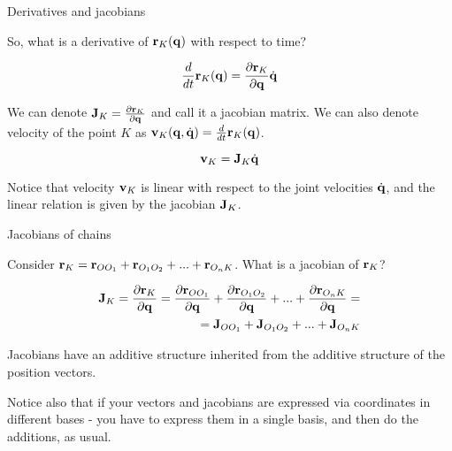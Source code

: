 \documentclass{beamer}
\begin{document}
\begin{frame}{Derivatives and jacobians}
	\begin{flushleft}
		
		So, what is a derivative of $\mathbf{r}_K(\mathbf{q})$ with respect to time?  
		
		\begin{equation}
			\frac{d}{dt} \mathbf{r}_K(\mathbf{q}) = 
			\frac{\partial \mathbf{r}_K}{\partial \mathbf{q}} \dot{ \mathbf{q} }
		\end{equation}
	
	We can denote $\mathbf{J}_K = \frac{\partial \mathbf{r}_K}{\partial \mathbf{q}} $ and call it a jacobian matrix. We can also denote velocity of the point $K$ as $\mathbf{v}_K(\mathbf{q}, \dot{ \mathbf{q} }) = \frac{d}{dt} \mathbf{r}_K(\mathbf{q})$.
		
		\begin{equation}
	\mathbf{v}_K = 
	\mathbf{J}_K \dot{ \mathbf{q} }
		\end{equation}		
	
	\bigskip
	
	Notice that velocity $\mathbf{v}_K$ is linear with respect to the joint velocities $\dot{ \mathbf{q} }$, and the linear relation is given by the jacobian $\mathbf{J}_K$.
		
	\end{flushleft}
\end{frame}



\begin{frame}{Jacobians of chains}
	\begin{flushleft}
		
		Consider $\mathbf{r}_K = \mathbf{r}_{OO_1} + \mathbf{r}_{O_1O_2} + ... + \mathbf{r}_{O_nK}$. What is a jacobian of $\mathbf{r}_K$?
		
		\begin{align*}
	\mathbf{J}_K = 
	\frac{\partial \mathbf{r}_K}{\partial \mathbf{q}} =
	\frac{\partial \mathbf{r}_{OO_1}}{\partial \mathbf{q}} +
	\frac{\partial \mathbf{r}_{O_1O_2}}{\partial \mathbf{q}} +
	... +
	\frac{\partial \mathbf{r}_{O_nK}}{\partial \mathbf{q}}	
	= \\
	=\mathbf{J}_{OO_1} + \mathbf{J}_{O_1O_2} + ... + \mathbf{J}_{O_nK}
		\end{align*}		
		
		Jacobians have an additive structure inherited from the additive structure of the position vectors.
		
		\bigskip
		
		Notice also that if your vectors and jacobians are expressed via coordinates in different bases - you have to express them in a single basis, and then do the additions, as usual.
		
	\end{flushleft}
\end{frame}
\end{document}
